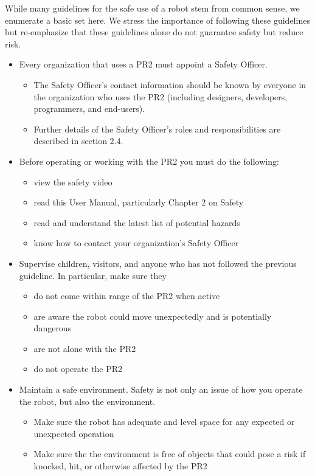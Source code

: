 While many guidelines for the safe use of a robot stem from common sense, we enumerate a basic set here.  We stress the importance of following these guidelines but re-emphasize that these guidelines alone do not guarantee safety but reduce risk.
\begin{itemize}
\item Every organization that uses a PR2 must appoint a Safety Officer.
\begin{itemize}
\item The Safety Officer's contact information should be known by everyone in the organization who uses the PR2 (including designers, developers, programmers, and end-users).
\item Further details of the Safety Officer's roles and responsibilities are described in section 2.4.
\end{itemize}
\item Before operating or working with the PR2 you must do the following:
\begin{itemize}
\item view the safety video
\item read this User Manual, particularly Chapter 2 on Safety
\item read and understand the latest list of potential hazards
\item know how to contact your organization's Safety Officer
\end{itemize}
\item Supervise children, visitors, and anyone who has not followed the previous guideline.  In particular, make sure they
\begin{itemize}
\item do not come within range of the PR2 when active
\item are aware the robot could move unexpectedly and is potentially dangerous
\item are not alone with the PR2
\item do not operate the PR2
\end{itemize}
\item Maintain a safe environment.  Safety is not only an issue of how you operate the robot, but also the environment.
\begin{itemize}
\item Make sure the robot has adequate and level space for any expected or unexpected operation
\item Make sure the the environment is free of objects that could pose a risk if knocked, hit, or otherwise affected by the PR2

\end{itemize}
\end{itemize}
